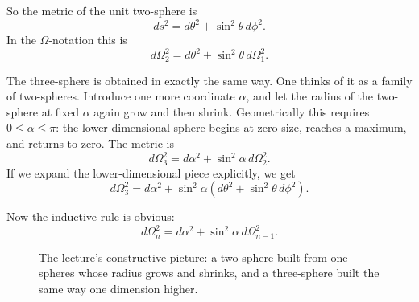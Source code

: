 So the metric of the unit two-sphere is
\begin{equation}
ds^2=d\theta^2+\sin^2\theta\,d\phi^2.
\end{equation}
In the \(\Omega\)-notation this is
\begin{equation}
d\Omega_2^2=d\theta^2+\sin^2\theta\,d\Omega_1^2.
\end{equation}

The three-sphere is obtained in exactly the same way. One thinks of it as a family of two-spheres. Introduce one more coordinate \(\alpha\), and let the radius of the two-sphere at fixed \(\alpha\) again grow and then shrink. Geometrically this requires \(0\leq \alpha \leq \pi\): the lower-dimensional sphere begins at zero size, reaches a maximum, and returns to zero. The metric is
\begin{equation}
d\Omega_3^2=d\alpha^2+\sin^2\alpha\,d\Omega_2^2.
\end{equation}
If we expand the lower-dimensional piece explicitly, we get
\begin{equation}
d\Omega_3^2=d\alpha^2+\sin^2\alpha\left(d\theta^2+\sin^2\theta\,d\phi^2\right).
\end{equation}

Now the inductive rule is obvious:
\begin{equation}
d\Omega_n^2=d\alpha^2+\sin^2\alpha\,d\Omega_{n-1}^2.
\end{equation}

\begin{figure}[htbp]
\centering
{}%
\caption{The lecture's constructive picture: a two-sphere built from one-spheres whose radius grows and shrinks, and a three-sphere built the same way one dimension higher.}
\end{figure}

